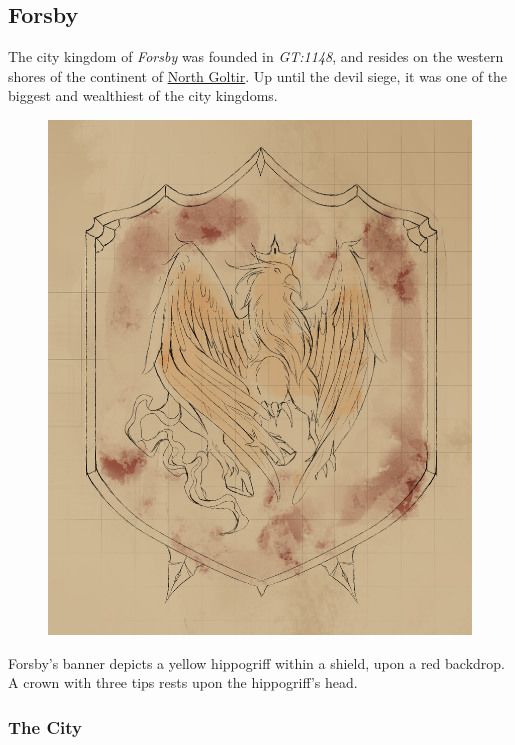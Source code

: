 \subsection{Forsby}
\label{sec:Forsby}


The city kingdom of \emph{Forsby} was founded in \emph{GT:1148}, and resides
on the western shores of the continent of \hyperref[sec:Goltir]{North Goltir}.
Up until the devil siege, it was one of the biggest and wealthiest of the city
kingdoms.

\begin{figure}[!ht]
  \centering
  \includegraphics[width=0.9\linewidth]{media/forsby_banner_sm.png}
\end{figure}

Forsby's banner depicts a yellow hippogriff within a shield, upon a red
backdrop. A crown with three tips rests upon the hippogriff's head.

\subsubsection{The City}

